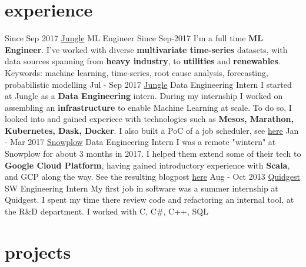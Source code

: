 \documentclass[]{colobas-cv}
\begin{document}
\section{experience}
\entry
  {Since Sep 2017}
  {\href{https://jungle.ai}{Jungle}}
  {ML Engineer}
  {Since Sep-2017 I'm a full time \textbf{ML Engineer}. I've worked with diverse 
  \textbf{multivariate time-series} datasets, with data sources spanning from 
  \textbf{heavy industry}, to \textbf{utilities} and \textbf{renewables}.
  Keywords: machine learning, time-series, root cause analysis, forecasting,
  probabilistic modelling}
\entry
  {Jul - Sep 2017}
  {\href{https://jungle.ai}{Jungle}}
  {Data Engineering Intern}
  {I started at Jungle as a \textbf{Data Engineering} intern. During my internship I
  worked on assembling an \textbf{infrastructure} to enable Machine Learning at scale.
  To do so, I looked into and gained experiece with technologies such as
  \textbf{Mesos, Marathon, Kubernetes, Dask, Docker}. I also built a PoC of a
  job scheduler, see \href{https://github.com/colobas/obras}{here}}
\entry
  {Jan - Mar 2017}
  {\href{https://snowplowanalytics.com}{Snowplow}}
  {Data Engineering Intern}
  {I was a remote "wintern" at Snowplow for about 3 months in 2017. I helped
  them extend some of their tech to \textbf{Google Cloud Platform}, having gained 
  introductory experience with \textbf{Scala}, and GCP along the way. See the
  resulting blogpost \href{https://snowplowanalytics.com/blog/2017/03/30/google-cloud-dataflow-example-project-released/}{here}}
\entry
  {Aug - Oct 2013}
  {\href{https://quidgest.com}{Quidgest}}
  {SW Engineering Intern}
  {My first job in software was a summer internship at Quidgest. I spent my time
  there review code and refactoring an internal tool, at the R\&D department.
  I worked with C, C\#, C++, SQL}
\section{projects}
\end{document}

